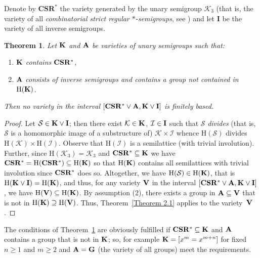 \documentclass[11pt,reqno]{amsart}
\numberwithin{equation}{section}
\newtheorem{Thm}{Theorem}[section]
\theoremstyle{remark}
\def\pv#1{{\bf #1}}
\def\H{\mathrm H}
\begin{document}
Denote by $\mathbf{CSR^*}$ the variety generated by the unary
semigroup $\mathcal{K}_3$ (that is, the variety of all
\emph{combinatorial strict regular $*$-semigroups}, see \cite{A1})
and let $\mathbf{I}$ be the variety of all inverse semigroups.
\begin{Thm}
\label{Theorem 3.2} Let $\pv K$ and $\pv A$ be varieties of unary
semigroups such that:
\begin{enumerate}
\item $\pv K$ contains $\pv{CSR^*}$,
\item $\pv A$ consists of inverse semigroups and contains
a group not contained in $\H(\pv K)$.
\end{enumerate}
Then no variety in the interval $[\pv{CSR^*}\vee \pv A, \pv
K\vee\pv{I}]$ is finitely based.
\end{Thm}

\begin{proof}
Let $\mathcal{S}\in \pv K\vee\pv I$; then there exist
$\mathcal{K}\in \pv K$, $\mathcal{I}\in \pv I$ such that
$\mathcal{S}$ \emph{divides} (that is, $\mathcal{S}$ is a
homomorphic image of a substructure of)
$\mathcal{K}\times\mathcal{I}$ whence $\H(\mathcal{S})$ divides
$\H(\mathcal{K})\times \H(\mathcal{I})$. Observe that
$\H(\mathcal{I})$ is a semilattice (with trivial involution).
Further, since $\H(\mathcal{K}_3)=\mathcal{K}_3$ and $\pv
{CSR^*}\subseteq \pv K$ we have
$\pv{CSR^*}=\H(\pv{CSR^*})\subseteq \H (\pv K)$ so that $\H (\pv
K)$ contains all semilattices with trivial involution since
$\pv{CSR^*}$ does so. Altogether, we have $\H(\mathcal{S})\in
\H(\pv K)$, that is $\H(\pv K\vee\pv I)=\H(\pv K)$, and thus, for
any variety $\pv V$ in the interval $[\pv{CSR^*}\vee \pv A, \pv
K\vee\pv{I}]$, we have $\H(\pv V)\subseteq \H(\pv K)$. By
assumption (2), there exists a group in $\pv A\subseteq \pv V$
that is not in $\H(\pv K)\supseteq \H(\pv V)$. Thus,
Theorem~\ref{Theorem 2.1} applies to the variety~$\pv V$.
\end{proof}

The conditions of Theorem~\ref{Theorem 3.2} are obviously
fulfilled if $\pv{CSR^*}\subseteq \pv K$ and $\pv A$ contains a
group that is not in $\pv K$; so, for example $\pv
K=[x^m=x^{m+n}]$ for fixed $n\ge 1$ and $m\ge 2$ and $\pv A=\pv G$
(the variety of all groups) meet the requirements.
\end{document}
